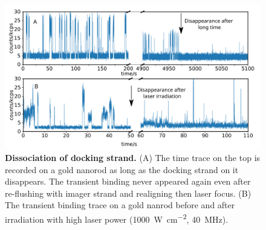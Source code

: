 \begin{figure}[ht]
  \centering
  \includegraphics[width=\textwidth]{dissociation_transbind}
  \makeatletter
  \renewcommand{\fnum@figure}{\figurename~S\thefigure}
  \makeatother
  \caption{\textbf{Dissociation of docking strand.}
  (A) The time trace on the top is recorded on a gold nanorod as long as the docking strand on it disappears.
  The transient binding never appeared again even after re-flushing with imager strand and realigning then laser focus.
  (B) The transient binding trace on a gold nanrod before and after irradiation with high laser power (\SI[per-mode=repeated-symbol]{1000}{\watt\per\cm\squared}, \SI{40}{\MHz}).
  }
  \label{SIfig:dissociation_transbind}
\end{figure}